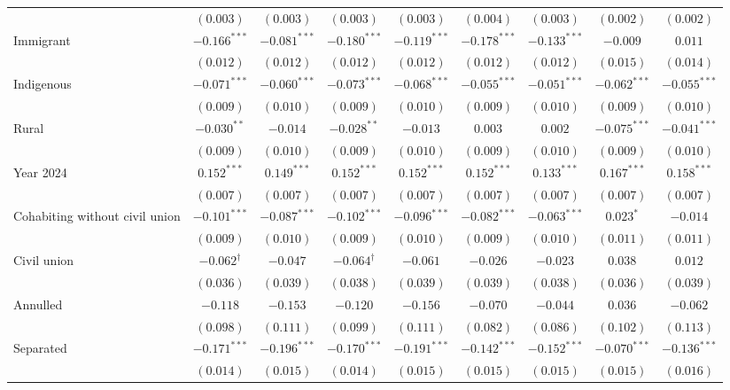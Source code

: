 \begin{table}[htpb]
{\begin{tabular}{l c c c c c c c c}
 & $(0.003)$ & $(0.003)$ & $(0.003)$ & $(0.003)$ & $(0.004)$ & $(0.003)$ & $(0.002)$ & $(0.002)$ \\
Immigrant & $-0.166^{***}$ & $-0.081^{***}$ & $-0.180^{***}$ & $-0.119^{***}$ & $-0.178^{***}$ & $-0.133^{***}$ & $-0.009$ & $0.011$ \\
 & $(0.012)$ & $(0.012)$ & $(0.012)$ & $(0.012)$ & $(0.012)$ & $(0.012)$ & $(0.015)$ & $(0.014)$ \\
Indigenous & $-0.071^{***}$ & $-0.060^{***}$ & $-0.073^{***}$ & $-0.068^{***}$ & $-0.055^{***}$ & $-0.051^{***}$ & $-0.062^{***}$ & $-0.055^{***}$ \\
 & $(0.009)$ & $(0.010)$ & $(0.009)$ & $(0.010)$ & $(0.009)$ & $(0.010)$ & $(0.009)$ & $(0.010)$ \\
Rural & $-0.030^{**}$ & $-0.014$ & $-0.028^{**}$ & $-0.013$ & $0.003$ & $0.002$ & $-0.075^{***}$ & $-0.041^{***}$ \\
 & $(0.009)$ & $(0.010)$ & $(0.009)$ & $(0.010)$ & $(0.009)$ & $(0.010)$ & $(0.009)$ & $(0.010)$ \\
Year 2024 & $0.152^{***}$ & $0.149^{***}$ & $0.152^{***}$ & $0.152^{***}$ & $0.152^{***}$ & $0.133^{***}$ & $0.167^{***}$ & $0.158^{***}$ \\
 & $(0.007)$ & $(0.007)$ & $(0.007)$ & $(0.007)$ & $(0.007)$ & $(0.007)$ & $(0.007)$ & $(0.007)$ \\
Cohabiting without civil union & $-0.101^{***}$ & $-0.087^{***}$ & $-0.102^{***}$ & $-0.096^{***}$ & $-0.082^{***}$ & $-0.063^{***}$ & $0.023^{*}$ & $-0.014$ \\
 & $(0.009)$ & $(0.010)$ & $(0.009)$ & $(0.010)$ & $(0.009)$ & $(0.010)$ & $(0.011)$ & $(0.011)$ \\
Civil union & $-0.062^{\dagger}$ & $-0.047$ & $-0.064^{\dagger}$ & $-0.061$ & $-0.026$ & $-0.023$ & $0.038$ & $0.012$ \\
 & $(0.036)$ & $(0.039)$ & $(0.038)$ & $(0.039)$ & $(0.039)$ & $(0.038)$ & $(0.036)$ & $(0.039)$ \\
Annulled & $-0.118$ & $-0.153$ & $-0.120$ & $-0.156$ & $-0.070$ & $-0.044$ & $0.036$ & $-0.062$ \\
 & $(0.098)$ & $(0.111)$ & $(0.099)$ & $(0.111)$ & $(0.082)$ & $(0.086)$ & $(0.102)$ & $(0.113)$ \\
Separated & $-0.171^{***}$ & $-0.196^{***}$ & $-0.170^{***}$ & $-0.191^{***}$ & $-0.142^{***}$ & $-0.152^{***}$ & $-0.070^{***}$ & $-0.136^{***}$ \\
 & $(0.014)$ & $(0.015)$ & $(0.014)$ & $(0.015)$ & $(0.015)$ & $(0.015)$ & $(0.015)$ & $(0.016)$ \\

\end{tabular}}
\end{table}
